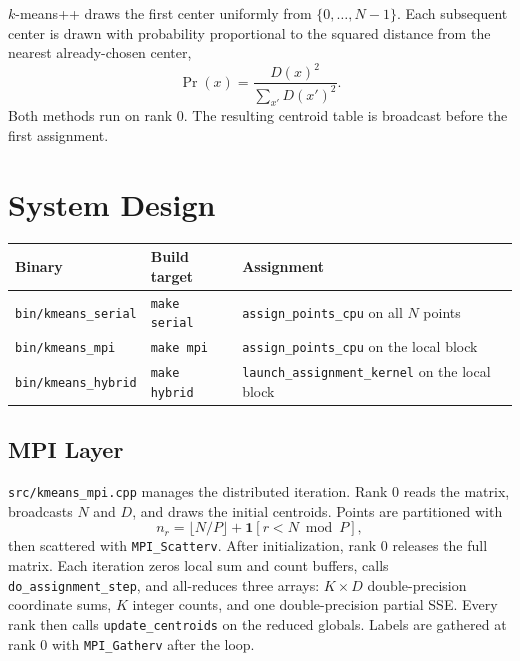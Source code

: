 \documentclass[12pt,a4paper]{article}
\DeclareRobustCommand{\code}[1]{\texttt{#1}}
\DeclareRobustCommand{\file}[1]{\texttt{#1}}
\begin{document}
$k$-means++ \cite{arthur2007} draws the first center uniformly from $\{0,\ldots,N-1\}$. Each subsequent center is drawn with probability proportional to the squared distance from the nearest already-chosen center,
\begin{equation}
  \Pr(x) = \frac{D(x)^2}{\sum_{x'} D(x')^2} .
  \label{eq:kpp}
\end{equation}
Both methods run on rank 0. The resulting centroid table is broadcast before the first assignment.

\section{System Design}
\label{sec:design}

\begin{center}
\renewcommand{\arraystretch}{1.2}
\begin{tabularx}{\textwidth}{@{}l l X@{}}
\toprule
\textbf{Binary} & \textbf{Build target} & \textbf{Assignment} \\
\midrule
\code{bin/kmeans\_serial}  & \code{make serial} & \code{assign\_points\_cpu} on all $N$ points \\
\code{bin/kmeans\_mpi}     & \code{make mpi}    & \code{assign\_points\_cpu} on the local block \\
\code{bin/kmeans\_hybrid}  & \code{make hybrid} & \code{launch\_assignment\_kernel} on the local block \\
\bottomrule
\end{tabularx}
\end{center}

\subsection{MPI Layer}

\file{src/kmeans\_mpi.cpp} manages the distributed iteration. Rank 0 reads the matrix, broadcasts $N$ and $D$, and draws the initial centroids. Points are partitioned with
\begin{equation}
  n_r = \big\lfloor N/P \big\rfloor + \mathbf{1}[r < N \bmod P],
  \label{eq:partition}
\end{equation}
then scattered with \code{MPI\_Scatterv}. After initialization, rank 0 releases the full matrix. Each iteration zeros local sum and count buffers, calls \code{do\_assignment\_step}, and all-reduces three arrays: $K \times D$ double-precision coordinate sums, $K$ integer counts, and one double-precision partial SSE. Every rank then calls \code{update\_centroids} on the reduced globals. Labels are gathered at rank 0 with \code{MPI\_Gatherv} after the loop.
\end{document}
